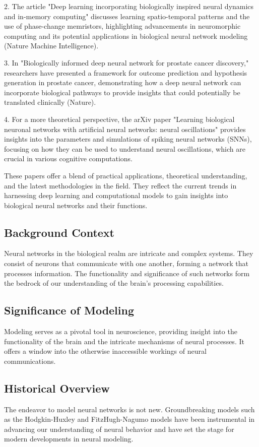 \documentclass[paper=a4, fontsize=11pt]{scrartcl} %
\numberwithin{equation}{section} %
\numberwithin{figure}{section} %
\numberwithin{table}{section} %
\begin{document}
2. The article "Deep learning incorporating biologically inspired neural dynamics and in-memory computing" discusses learning spatio-temporal patterns and the use of phase-change memristors, highlighting advancements in neuromorphic computing and its potential applications in biological neural network modeling (Nature Machine Intelligence).

3. In "Biologically informed deep neural network for prostate cancer discovery," researchers have presented a framework for outcome prediction and hypothesis generation in prostate cancer, demonstrating how a deep neural network can incorporate biological pathways to provide insights that could potentially be translated clinically (Nature).

4. For a more theoretical perspective, the arXiv paper "Learning biological neuronal networks with artificial neural networks: neural oscillations" provides insights into the parameters and simulations of spiking neural networks (SNNs), focusing on how they can be used to understand neural oscillations, which are crucial in various cognitive computations.

These papers offer a blend of practical applications, theoretical understanding, and the latest methodologies in the field. They reflect the current trends in harnessing deep learning and computational models to gain insights into biological neural networks and their functions.


\subsection{Background Context}
Neural networks in the biological realm are intricate and complex systems. They consist of neurons that communicate with one another, forming a network that processes information. The functionality and significance of such networks form the bedrock of our understanding of the brain's processing capabilities.

\subsection{Significance of Modeling}
Modeling serves as a pivotal tool in neuroscience, providing insight into the functionality of the brain and the intricate mechanisms of neural processes. It offers a window into the otherwise inaccessible workings of neural communications.

\subsection{Historical Overview}
The endeavor to model neural networks is not new. Groundbreaking models such as the Hodgkin-Huxley and FitzHugh-Nagumo models have been instrumental in advancing our understanding of neural behavior and have set the stage for modern developments in neural modeling.
\end{document}
